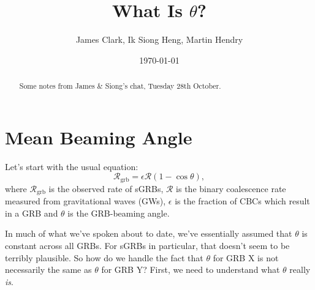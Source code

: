 \documentclass[onecolumn,nofootinbib]{revtex4-1}
\newcommand{\grbrate}{{{\mathcal R}_{\mathrm{grb}}}}
\newcommand{\cbcrate}{{{\mathcal R}}}
\def\gw#1{gravitational wave#1 (GW#1)\gdef\gw{GW}}
\begin{document}
\title{What Is $\theta$?}
\author{James Clark, Ik Siong Heng, Martin Hendry}
\date{\today}

\begin{abstract}
Some notes from James \& Siong's chat, Tuesday 28th October.  
\end{abstract}

\maketitle

\section{Mean Beaming Angle}
Let's start with the usual equation:
\begin{equation}\label{eq:rate2angle}
\grbrate=\epsilon\cbcrate(1-\cos \theta),
\end{equation}
%
where $\grbrate$ is the observed rate of sGRBs, $\cbcrate$ is the binary
coalescence rate measured from \gw{s}, $\epsilon$ is the fraction of CBCs which
result in a GRB and $\theta$ is the GRB-beaming angle.

In much of what we've spoken about to date, we've essentially assumed that
$\theta$ is constant across all GRBs.  For sGRBs in particular, that doesn't
seem to be terribly plausible.  So how do we handle the fact that $\theta$ for
GRB X is not necessarily the same as $\theta$ for GRB Y?  First, we need to
understand what $\theta$ really \emph{is}.
\end{document}

